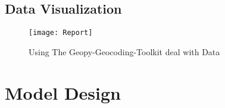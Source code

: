 \documentclass{mcmthesis}
\begin{document}
\subsection{Data Visualization}  %

\begin{figure}[!h] %
\small
\centering
\texttt{[image: Report]}
\caption{Using The Geopy-Geocoding-Toolkit deal with Data} \label{fig:Report Times}
\end{figure}









\section{Model Design}
\end{document}
